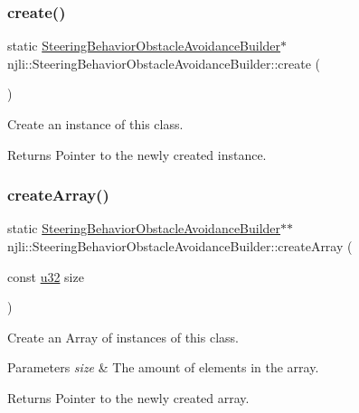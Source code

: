 \subsubsection{\texorpdfstring{create()}{create()}}
{\footnotesize\ttfamily static \mbox{\hyperlink{classnjli_1_1_steering_behavior_obstacle_avoidance_builder}{Steering\+Behavior\+Obstacle\+Avoidance\+Builder}}$\ast$ njli\+::\+Steering\+Behavior\+Obstacle\+Avoidance\+Builder\+::create (\begin{DoxyParamCaption}{ }\end{DoxyParamCaption})\hspace{0.3cm}{\ttfamily [static]}}

Create an instance of this class.

\begin{DoxyReturn}{Returns}
Pointer to the newly created instance. 
\end{DoxyReturn}
\mbox{\label{classnjli_1_1_steering_behavior_obstacle_avoidance_builder_a1804ba7112f1b99ce664e0a011038865}} 
\subsubsection{\texorpdfstring{create\+Array()}{createArray()}}
{\footnotesize\ttfamily static \mbox{\hyperlink{classnjli_1_1_steering_behavior_obstacle_avoidance_builder}{Steering\+Behavior\+Obstacle\+Avoidance\+Builder}}$\ast$$\ast$ njli\+::\+Steering\+Behavior\+Obstacle\+Avoidance\+Builder\+::create\+Array (\begin{DoxyParamCaption}\item[{const \mbox{\hyperlink{_util_8h_a10e94b422ef0c20dcdec20d31a1f5049}{u32}}}]{size }\end{DoxyParamCaption})\hspace{0.3cm}{\ttfamily [static]}}

Create an Array of instances of this class.


\begin{DoxyParams}{Parameters}
{\em size} & The amount of elements in the array.\\
\hline
\end{DoxyParams}
\begin{DoxyReturn}{Returns}
Pointer to the newly created array. 
\end{DoxyReturn}
\mbox{\label{classnjli_1_1_steering_behavior_obstacle_avoidance_builder_a7f2e82b1b5459411bc9082a812e53809}} 
